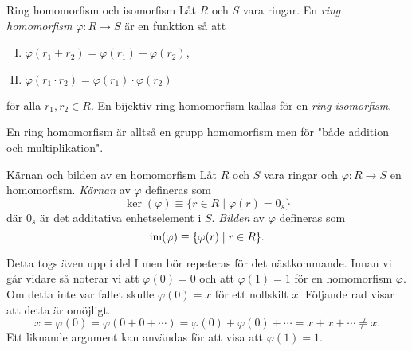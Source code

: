 \documentclass{article}
\newcommand{\im}[0]{\textnormal{im}}
\theoremstyle{definition}
\begin{document}
\begin{mydef}{Ring homomorfism och isomorfism}{}
  Låt $R$ och $S$ vara ringar. En \textit{ring homomorfism} $\varphi: R \rightarrow S$ är en funktion så att 
  \begin{enumerate}[I)]
    \item $\varphi(r_1 + r_2) = \varphi(r_1) + \varphi(r_2)$,
    \item $\varphi(r_1 \cdot r_2) = \varphi(r_1) \cdot \varphi(r_2)$
  \end{enumerate}
  för alla $r_1, r_2 \in R$. En bijektiv ring homomorfism kallas för en \textit{ring isomorfism}.
\end{mydef}
En ring homomorfism är alltså en grupp homomorfism men för "både addition och multiplikation".

\begin{mydef}{Kärnan och bilden av en homomorfism}{}
  Låt $R$ och $S$ vara ringar och $\varphi: R \rightarrow S$ en homomorfism. \textit{Kärnan} av $\varphi$
  defineras som 
  \[\ker(\varphi) \equiv \{r \in R \; | \; \varphi(r) = 0_s\}\]
  där $0_s$ är det additativa enhetselement i $S$.
  \textit{Bilden} av $\varphi$ defineras som 
  \[\im(\varphi) \equiv \{\varphi(r) \; | \; r \in R\}.\]
\end{mydef}
Detta togs även upp i del I men bör repeteras för det nästkommande. Innan vi går vidare 
så noterar vi att $\varphi(0) = 0$ och att $\varphi(1) = 1$ för en homomorfism $\varphi$. Om detta inte var fallet skulle $\varphi(0) = x$ för ett nollskilt $x$. 
Följande rad visar att detta är omöjligt.
\[x = \varphi(0) = \varphi(0 + 0 + \cdots) = \varphi(0) + \varphi(0) + \cdots =  x + x + \cdots \neq x.\]
Ett liknande argument kan användas för att visa att $\varphi(1) = 1$.
\end{document}
